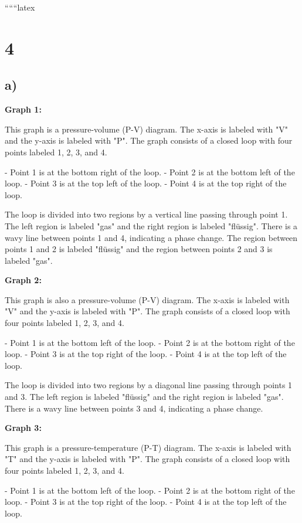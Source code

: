 
``````latex


\section*{4}

\subsection*{a)}

\textbf{Graph 1:}

This graph is a pressure-volume (P-V) diagram. The x-axis is labeled with "V" and the y-axis is labeled with "P". The graph consists of a closed loop with four points labeled 1, 2, 3, and 4. 

- Point 1 is at the bottom right of the loop.
- Point 2 is at the bottom left of the loop.
- Point 3 is at the top left of the loop.
- Point 4 is at the top right of the loop.

The loop is divided into two regions by a vertical line passing through point 1. The left region is labeled "gas" and the right region is labeled "flüssig". There is a wavy line between points 1 and 4, indicating a phase change. The region between points 1 and 2 is labeled "flüssig" and the region between points 2 and 3 is labeled "gas".

\textbf{Graph 2:}

This graph is also a pressure-volume (P-V) diagram. The x-axis is labeled with "V" and the y-axis is labeled with "P". The graph consists of a closed loop with four points labeled 1, 2, 3, and 4.

- Point 1 is at the bottom left of the loop.
- Point 2 is at the bottom right of the loop.
- Point 3 is at the top right of the loop.
- Point 4 is at the top left of the loop.

The loop is divided into two regions by a diagonal line passing through points 1 and 3. The left region is labeled "flüssig" and the right region is labeled "gas". There is a wavy line between points 3 and 4, indicating a phase change.

\textbf{Graph 3:}

This graph is a pressure-temperature (P-T) diagram. The x-axis is labeled with "T" and the y-axis is labeled with "P". The graph consists of a closed loop with four points labeled 1, 2, 3, and 4.

- Point 1 is at the bottom left of the loop.
- Point 2 is at the bottom right of the loop.
- Point 3 is at the top right of the loop.
- Point 4 is at the top left of the loop.

